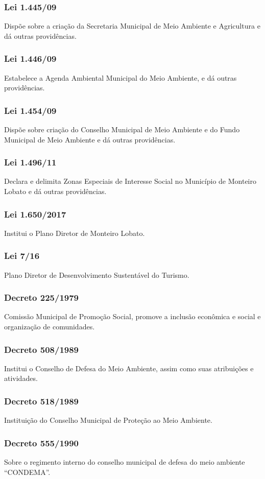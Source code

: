 \begin{subapend}
\begin{subsubapend}
		\subsubsection{Lei 1.445/09}
		Dispõe sobre a criação da Secretaria Municipal de Meio Ambiente e Agricultura e dá outras providências.
		\subsubsection{Lei 1.446/09}
		Estabelece a Agenda Ambiental Municipal do Meio Ambiente, e dá outras providências.
		\subsubsection{Lei 1.454/09}
		Dispõe sobre criação do Conselho Municipal de Meio Ambiente e do Fundo Municipal de Meio Ambiente e dá outras providências.
		\subsubsection{Lei 1.496/11}
		Declara e delimita Zonas Especiais de Interesse Social no Município de Monteiro Lobato e dá outras providências.
		\subsubsection{Lei 1.650/2017}
		Institui o Plano Diretor de Monteiro Lobato.
		\subsubsection{Lei 7/16}
		Plano Diretor de Desenvolvimento Sustentável do Turismo.
		\subsubsection{Decreto 225/1979}
		Comissão Municipal de Promoção Social, promove a inclusão econômica e social e organização de comunidades.
		\subsubsection{Decreto 508/1989}
		Institui o Conselho de Defesa do Meio Ambiente, assim como suas atribuições e atividades.
		\subsubsection{Decreto 518/1989}
		Instituição do Conselho Municipal de Proteção ao Meio Ambiente.
		\subsubsection{Decreto 555/1990}
		Sobre o regimento interno do conselho municipal de defesa do meio ambiente “CONDEMA”.

\end{subsubapend}
\end{subapend}
